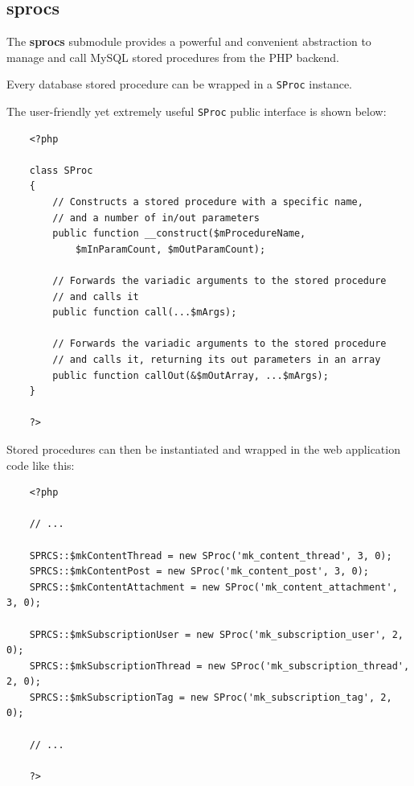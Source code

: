\documentclass[12pt]{report}
\renewcommand\emph{\textbf}
\begin{document}
                \subsection{sprocs}

                    The \emph{sprocs} submodule provides a powerful and convenient abstraction to manage and call MySQL stored procedures from the PHP backend.

                    Every database stored procedure can be wrapped in a \texttt{SProc} instance.

                    The user-friendly yet extremely useful \texttt{SProc} public interface is shown below:

                    \begin{verbatim}
    <?php

    class SProc
    {
        // Constructs a stored procedure with a specific name,
        // and a number of in/out parameters
        public function __construct($mProcedureName, 
            $mInParamCount, $mOutParamCount);

        // Forwards the variadic arguments to the stored procedure
        // and calls it
        public function call(...$mArgs);

        // Forwards the variadic arguments to the stored procedure
        // and calls it, returning its out parameters in an array
        public function callOut(&$mOutArray, ...$mArgs);
    }

    ?>
                    \end{verbatim}      

                    Stored procedures can then be instantiated and wrapped in the web application code like this:

                    \begin{verbatim}          
    <?php

    // ...

    SPRCS::$mkContentThread = new SProc('mk_content_thread', 3, 0);
    SPRCS::$mkContentPost = new SProc('mk_content_post', 3, 0);
    SPRCS::$mkContentAttachment = new SProc('mk_content_attachment', 3, 0);

    SPRCS::$mkSubscriptionUser = new SProc('mk_subscription_user', 2, 0);
    SPRCS::$mkSubscriptionThread = new SProc('mk_subscription_thread', 2, 0);
    SPRCS::$mkSubscriptionTag = new SProc('mk_subscription_tag', 2, 0);

    // ...

    ?>
                    \end{verbatim}      
\end{document}
